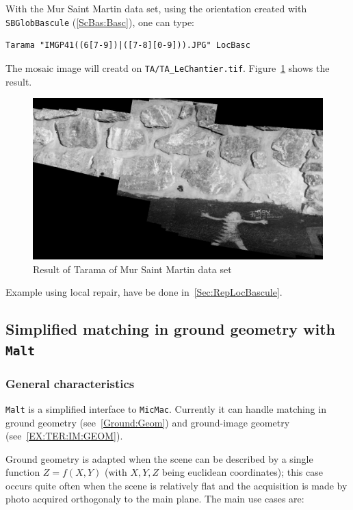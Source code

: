 With the Mur Saint Martin data set,  using the orientation created with
{\tt SBGlobBascule} (\ref{ScBas:Basc}), one can type:

\begin{verbatim}
Tarama "IMGP41((6[7-9])|([7-8][0-9])).JPG" LocBasc
\end{verbatim}

The mosaic image will creatd on {\tt TA/TA\_LeChantier.tif}.
Figure~\ref{FIG:Rectif:StMartin} shows the result.


\begin{figure}
\begin{center}
\includegraphics[width=120mm]{FIGS/MurSaintMartin/TA_LeChantier.jpg}
\end{center}
\caption{Result of Tarama of Mur Saint Martin data set}
\label{FIG:Rectif:StMartin}
\end{figure}


Example using local repair, have be done in~\ref{Sec:RepLocBascule}.



\subsection{Simplified matching in ground geometry with {\tt Malt}}\label{subsec:Malt}

\subsubsection{General characteristics}

{\tt Malt} is a simplified  interface to  {\tt MicMac}. Currently it can
handle matching in ground geometry (see~\ref{Ground:Geom}) and
ground-image geometry (see~\ref{EX:TER:IM:GEOM}).


Ground geometry is adapted
when the scene can be described by a single function $Z=f(X,Y)$ (with $X,Y,Z$
being euclidean coordinates); this case occurs quite often when the
scene is relatively flat and the acquisition is made by photo acquired
orthogonaly to the main plane. The main use cases are:

